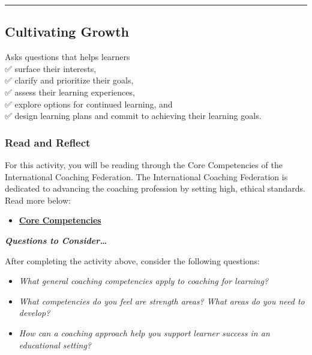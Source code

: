 \documentclass[
]{book}
\providecommand{\tightlist}{%
  \setlength{\itemsep}{0pt}\setlength{\parskip}{0pt}}
\begin{document}
\begin{center}\rule{0.5\linewidth}{0.5pt}\end{center}

\hypertarget{cultivating-growth}{%
\subsection*{Cultivating Growth}\label{cultivating-growth}}

Asks questions that helps learners\\
✅ surface their interests,\\
✅ clarify and prioritize their goals,\\
✅ assess their learning experiences,\\
✅ explore options for continued learning, and\\
✅ design learning plans and commit to achieving their learning goals.

\begin{reflect}
\hypertarget{read-and-reflect-3}{%
\subsubsection{Read and Reflect}\label{read-and-reflect-3}}

For this activity, you will be reading through the Core Competencies of the International Coaching Federation. The International Coaching Federation is dedicated to advancing the coaching profession by setting high, ethical standards. Read more below:

\begin{itemize}
\tightlist
\item
  \href{https://coachfederation.org/core-competencies}{\textbf{Core Competencies}}
\end{itemize}

\textbf{\emph{Questions to Consider\ldots{}}}

After completing the activity above, consider the following questions:

\begin{itemize}
\tightlist
\item
  \emph{What general coaching competencies apply to coaching for learning?}
\item
  \emph{What competencies do you feel are strength areas? What areas do you need to develop?}
\item
  \emph{How can a coaching approach help you support learner success in an educational setting?}
\end{itemize}
\end{reflect}
\end{document}
